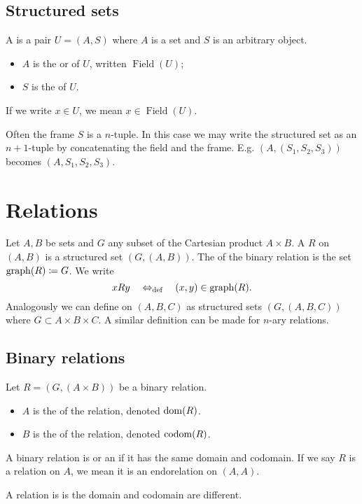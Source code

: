 \subsection{Structured sets}
\begin{definition}
A  is a pair $U = (A,S)$ where $A$ is a set and $S$ is an arbitrary object.
\begin{itemize}
\item $A$ is the  or  of $U$, written $\operatorname{Field}(U)$;
\item $S$ is the  of $U$.
\end{itemize}
If we write $x\in U$, we mean $x\in \operatorname{Field}(U)$.
\end{definition}

Often the frame $S$ is a $n$-tuple. In this case we may write the structured set as an $n+1$-tuple by concatenating the field and the frame. E.g. $(A,(S_1,S_2,S_3))$ becomes $(A,S_1,S_2,S_3)$.

\section{Relations}
\begin{definition}
Let $A,B$ be sets and $G$ any subset of the Cartesian product $A\times B$. A  $R$ on $(A, B)$ is a structured set $(G,(A,B))$. The  of the binary relation is the set $\operatorname{graph}(R) \coloneqq G$.
We write
\[ xRy \quad\Leftrightarrow_{\text{def}}\quad  (x,y)\in \operatorname{graph}(R). \]
Analogously we can define  on $(A,B,C)$ as structured sets $(G,(A,B,C))$ where $G \subset A\times B\times C$. A similar definition can be made for $n$-ary relations.
\end{definition}

\subsection{Binary relations}
\begin{definition}
Let $R = (G,(A\times B))$ be a binary relation.
\begin{itemize}
\item $A$ is the  of the relation, denoted $\operatorname{dom}(R)$.
\item $B$ is the  of the relation, denoted $\operatorname{codom}(R)$.
\end{itemize}
A binary relation is  or an  if it has the same domain and codomain.
If we say $R$ is a relation on $A$, we mean it is an endorelation on $(A,A)$. 

A relation is  is the domain and codomain are different.
\end{definition}

